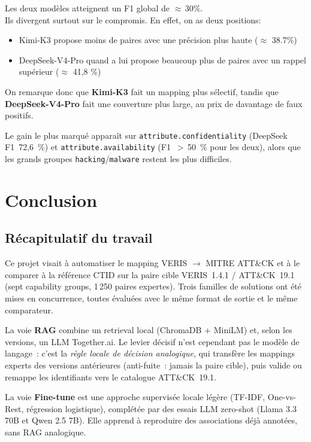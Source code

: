 \documentclass[a4paper,12pt]{article}
\begin{document}
Les deux modèles atteignent un F1 global de $\approx$\,30\%.\\
Ils divergent surtout sur le compromis. En effet, on as deux positions:
\begin{itemize}
	\item Kimi-K3 propose moins de paires avec une précision plus haute ($\approx$ 38.7\%)
	\item DeepSeek-V4-Pro quand a lui propose beaucoup plus de paires avec un rappel supérieur ($\approx$ 41,8 \%)
\end{itemize}

On remarque donc que \textbf{Kimi-K3} fait un mapping plus sélectif, tandis que \textbf{DeepSeek-V4-Pro} fait une couverture plus large, au prix de davantage de faux positifs.

Le gain le plus marqué apparaît sur \texttt{attribute.confidentiality} (DeepSeek F1~72,6~\%) et \texttt{attribute.availability} (F1~$>$\,50~\% pour les deux), alors que les grands groupes \texttt{hacking}/\texttt{malware} restent les plus difficiles.

\section{Conclusion}
\subsection{Récapitulatif du travail}

Ce projet visait à automatiser le mapping VERIS $\rightarrow$ MITRE ATT\&CK
et à le comparer à la référence CTID sur la paire cible VERIS~1.4.1 /
ATT\&CK~19.1 (sept capability groups, 1\,250 paires expertes). Trois
familles de solutions ont été mises en concurrence, toutes évaluées
avec le même format de sortie et le même comparateur.

La voie \textbf{RAG} combine un retrieval local (ChromaDB + MiniLM)
et, selon les versions, un LLM Together.ai. Le levier décisif n'est
cependant pas le modèle de langage~: c'est la \emph{règle locale de
décision analogique}, qui transfère les mappings experts des versions
antérieures (anti-fuite~: jamais la paire cible), puis valide ou
remappe les identifiants vers le catalogue ATT\&CK~19.1.

La voie \textbf{Fine-tune} est une approche supervisée locale légère
(TF-IDF, One-vs-Rest, régression logistique), complétée par des
essais LLM zero-shot (Llama 3.3 70B et Qwen 2.5 7B). Elle apprend à
reproduire des associations déjà annotées, sans RAG analogique.
\end{document}
